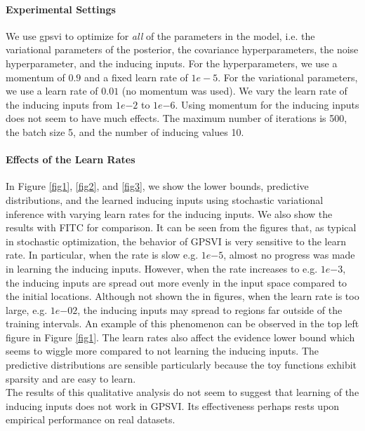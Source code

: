 \documentclass{article} %
\begin{document}
\noindent \paragraph{Experimental Settings} We use gpsvi to optimize for \textit{all} of the parameters in the model, i.e. the variational parameters of the posterior, the covariance hyperparameters, the noise hyperparameter, and the inducing inputs.
For the hyperparameters, we use a momentum of $0.9$ and a fixed learn rate of $1e-5$. 
For the variational parameters, we use a learn rate of $0.01$ (no momentum was used).
We vary the learn rate of the inducing inputs from $1e{-2}$ to $1e{-6}$.
Using momentum for the inducing inputs does not seem to have much effects.
The maximum number of iterations is 500, the batch size 5, and the number of inducing values 10.

\noindent \paragraph{Effects of the Learn Rates }
In Figure \ref{fig1}, \ref{fig2}, and \ref{fig3}, we show the lower bounds, predictive distributions, and the learned inducing inputs using stochastic variational inference with varying learn rates for the inducing inputs.
We also show the results with FITC for comparison.
It can be seen from the figures that, as typical in stochastic optimization, the behavior of GPSVI is very sensitive to the learn rate.
In particular, when the rate is slow e.g. $1e{-5}$, almost no progress was made in learning the inducing inputs.
However, when the rate increases to e.g. $1e{-3}$, the inducing inputs are spread out more evenly in the input space compared to the initial locations.
Although not shown the in figures, when the learn rate is too large, e.g. $1e{-02}$, the inducing inputs may spread to regions far outside of the training intervals.
An example of this phenomenon can be observed in the top left figure in Figure \ref{fig1}.
The learn rates also affect the evidence lower bound which seems to wiggle more compared to not learning the inducing inputs.
The predictive distributions are sensible particularly because the toy functions exhibit sparsity and are easy to learn.  \\

\noindent The results of this qualitative analysis do not seem to suggest that learning of the inducing inputs does not work in GPSVI.
Its effectiveness perhaps rests upon empirical performance on real datasets.
\end{document}
